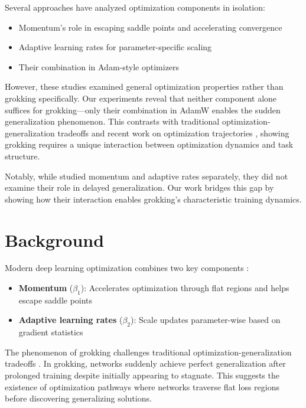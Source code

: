 \documentclass{article} %
\begin{document}
Several approaches have analyzed optimization components in isolation:
\begin{itemize}
    \item Momentum's role in escaping saddle points \citep{Ge2015EscapingFS} and accelerating convergence \citep{Nesterov1983AMF}
    \item Adaptive learning rates for parameter-specific scaling \citep{kingma2014adam}
    \item Their combination in Adam-style optimizers \citep{loshchilov2017adamw}
\end{itemize}

However, these studies examined general optimization properties rather than grokking specifically. Our experiments reveal that neither component alone suffices for grokking---only their combination in AdamW enables the sudden generalization phenomenon. This contrasts with traditional optimization-generalization tradeoffs \citep{goodfellow2016deep} and recent work on optimization trajectories \citep{Jastrzebski2020TheBP}, showing grokking requires a unique interaction between optimization dynamics and task structure.

Notably, while \citet{Xie2020AdaptiveID} studied momentum and adaptive rates separately, they did not examine their role in delayed generalization. Our work bridges this gap by showing how their interaction enables grokking's characteristic training dynamics.

\section{Background}
\label{sec:background}

Modern deep learning optimization combines two key components \citep{kingma2014adam,loshchilov2017adamw}:
\begin{itemize}
    \item \textbf{Momentum} ($\beta_1$): Accelerates optimization through flat regions and helps escape saddle points \citep{Nesterov1983AMF,Ge2015EscapingFS}
    \item \textbf{Adaptive learning rates} ($\beta_2$): Scale updates parameter-wise based on gradient statistics
\end{itemize}

The phenomenon of grokking \citep{power2022grokking} challenges traditional optimization-generalization tradeoffs \citep{goodfellow2016deep}. In grokking, networks suddenly achieve perfect generalization after prolonged training despite initially appearing to stagnate. This suggests the existence of optimization pathways where networks traverse flat loss regions before discovering generalizing solutions.
\end{document}
